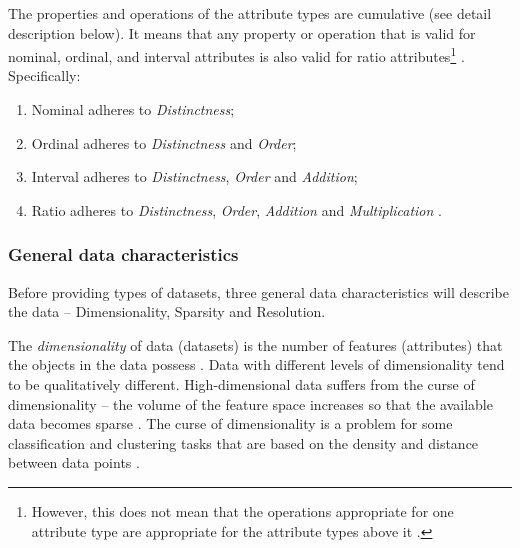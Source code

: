 				
				
				The properties and operations of the attribute types are cumulative \cite{Tan2013} (see detail description below). It means that any property or operation that is valid for nominal, ordinal, and interval attributes is also valid for ratio attributes\footnote{However, this does not mean that the operations appropriate for one attribute type are appropriate for the attribute types above it \cite{Tan2013}.} \cite{Tan2013}. Specifically:
				
				\begin{enumerate}
					\item Nominal adheres to \textit{Distinctness};
					\item Ordinal adheres to \textit{Distinctness} and \textit{Order};
					\item Interval adheres to \textit{Distinctness}, \textit{Order} and \textit{Addition};
					\item Ratio adheres to \textit{Distinctness}, \textit{Order},  \textit{Addition} and \textit{Multiplication} \cite{Tan2013}.
				\end{enumerate}						
						
						
			\subsubsection{General data characteristics}
			\label{subsec:general_data_characteristics}		
				\vspace*{0.3cm}
				Before providing types of datasets, three general data characteristics will describe the data -- Dimensionality, Sparsity and Resolution.
				
				The \emph{dimensionality} of data (datasets) is the number of features (attributes) that the objects in the data possess \cite{Tan2013}. Data with different levels of dimensionality tend to be qualitatively different. High-dimensional data suffers from the curse of dimensionality -- the volume of the feature space increases so that the available data becomes sparse \cite{Tan2013}. The curse of dimensionality is a problem for some classification and clustering tasks that are based on the density and distance between data points \cite{Tan2013}.
				
